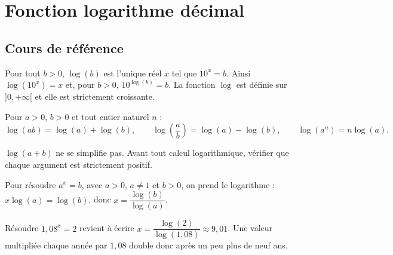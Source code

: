 
\chapter{Fonction logarithme décimal}
\section{Cours de référence}
\begin{retenir}
Pour tout $b>0$, $\log(b)$ est l'unique réel $x$ tel que $10^x=b$. Ainsi $\log(10^x)=x$ et, pour $b>0$, $10^{\log(b)}=b$. La fonction $\log$ est définie sur $]0,+\infty[$ et elle est strictement croissante.
\end{retenir}

\begin{center}
\end{center}

Pour $a>0$, $b>0$ et tout entier naturel $n$ :
\[
\log(ab)=\log(a)+\log(b),\qquad
\log\!\left(\frac{a}{b}\right)=\log(a)-\log(b),\qquad
\log(a^n)=n\log(a).
\]

\begin{erreur}
$\log(a+b)$ ne se simplifie pas. Avant tout calcul logarithmique, vérifier que chaque argument est strictement positif.
\end{erreur}

\begin{methode}
Pour résoudre $a^x=b$, avec $a>0$, $a\neq1$ et $b>0$, on prend le logarithme : $x\log(a)=\log(b)$, donc $x=\dfrac{\log(b)}{\log(a)}$.
\end{methode}

\begin{exemple}
Résoudre $1{,}08^x=2$ revient à écrire $x=\dfrac{\log(2)}{\log(1{,}08)}\approx9{,}01$. Une valeur multipliée chaque année par $1{,}08$ double donc après un peu plus de neuf ans.
\end{exemple}

